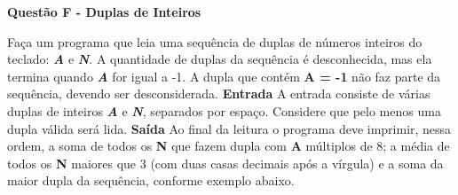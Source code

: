 \documentclass[a4paper, 12pt]{article}
\begin{document}
\newpage %
\begin{center}
\textbf{{\Large Questão F - Duplas de Inteiros}}
\end{center}
\vspace{5pt}
Faça um programa que leia uma sequência de duplas de números inteiros do teclado: \textbf{\textit{A}} e \textbf{\textit{N}}. A quantidade de duplas da sequência é desconhecida, mas ela termina quando \textbf{\textit{A}} for igual a -1. A dupla que contém \textbf{A = -1} não faz parte da sequência, devendo ser desconsiderada.
\newline \newline
\textbf{{\large Entrada}} \newline
A entrada consiste de várias duplas de inteiros \textbf{\textit{A}} e \textbf{\textit{N}}, separados por espaço. Considere que pelo menos uma dupla válida será lida.
\newline \newline
\textbf{{\large Saída}} \newline
Ao final da leitura o programa deve imprimir, nessa ordem, a soma de todos os \textbf{N} que fazem dupla com \textbf{A} múltiplos de 8; a média de todos os \textbf{N} maiores que 3 (com duas casas decimais após a vírgula) e a soma da maior dupla da sequência, conforme exemplo abaixo.
\newline
\end{document}
